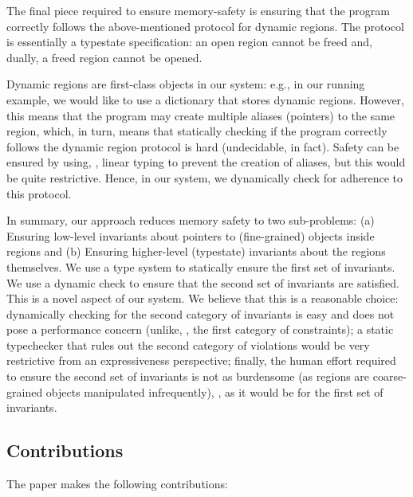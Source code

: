 The final piece required to ensure memory-safety is ensuring that the program correctly follows the above-mentioned
protocol for dynamic regions. The protocol is essentially a typestate specification: an open region cannot be freed and,
dually, a freed region cannot be opened.

Dynamic regions are first-class objects in our system: e.g., in our running example,
we would like to use a dictionary that stores dynamic regions. However, this means that the program may create multiple
aliases (pointers) to the same region, which, in turn, means that statically checking if the program correctly follows the
dynamic region protocol is hard (undecidable, in fact). Safety can be ensured by using, \eg, linear typing to prevent the
creation of aliases, but this would be quite restrictive. Hence, in our system, we dynamically check for adherence to
this protocol.

In summary, our approach reduces memory safety to two sub-problems:
(a) Ensuring  low-level invariants about pointers to (fine-grained) objects inside regions and 
(b) Ensuring higher-level (typestate) invariants about the regions themselves. 
We use a type system to statically ensure the first set of invariants. We use a dynamic check to ensure that the
second set of invariants are satisfied.
%
This is a novel aspect of our system. We believe that this is a reasonable choice:
dynamically checking for the second category of invariants is easy and does not pose a performance concern (unlike, \eg, the first category of constraints);
a static typechecker that rules out the second category of violations would be very restrictive from an expressiveness perspective;
finally, the human effort required to ensure the second set of invariants is not as burdensome (as regions are coarse-grained objects
manipulated infrequently), \eg, as it would be for the first set of invariants.

\subsection*{Contributions}

The paper makes the following contributions:

